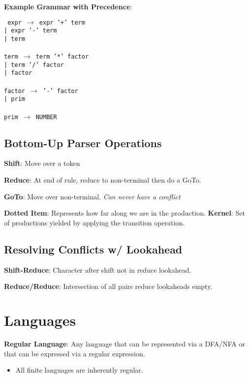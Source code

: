 \documentclass[10pt,twocolumn]{report}
\begin{document}
  \textbf{Example Grammar with Precedence}:
  
  \texttt{%
  expr $\rightarrow$ expr '+' term\\
  \hbox{\hspace{30pt}}| expr '-' term\\
  \hbox{\hspace{30pt}}| term\\
  \\
  term $\rightarrow$ term '*' factor\\
  \hbox{\hspace{30pt}}| term '/' factor\\
  \hbox{\hspace{30pt}}| factor\\
  \\
  factor $\rightarrow$ '-' factor\\
  \hbox{\hspace{39pt}}| prim\\
  \\
  prim $\rightarrow$ NUMBER}
  
  \subsection*{Bottom-Up Parser Operations}
  
  \textbf{Shift}: Move over a token
  
  \textbf{Reduce}: At end of rule, reduce to non-terminal then do a GoTo.
  
  \textbf{GoTo}: Move over non-terminal. \textit{Can never have a conflict}
  
  \textbf{Dotted Item}: Represents how far along we are in the production. \textbf{Kernel}: Set of productions yielded by applying the transition operation.
  
  \subsection*{Resolving Conflicts w/ Lookahead}
  \textbf{Shift-Reduce}: Character after shift not in reduce lookahead.
  
  \textbf{Reduce/Reduce}: Intersection of all pairs reduce lookaheads empty.
  
  \section*{Languages}
  
  \noindent
  \textbf{Regular Language}: Any language that can be represented via a DFA/NFA or that can be expressed via a regular expression.
  \begin{itemize}
    \item All finite languages are inherently regular.
  \end{itemize}
\end{document}
